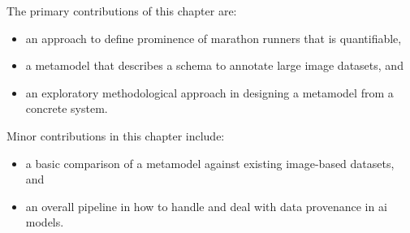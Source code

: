 \bigskip

\noindent
The primary contributions of this chapter are:

\begin{itemize}
  \item an approach to define prominence of marathon runners that is quantifiable,
  \item a metamodel that describes a schema to annotate large image datasets, and
  \item an exploratory methodological approach in designing a metamodel from a concrete system.
\end{itemize}

\noindent
Minor contributions in this chapter include:

\begin{itemize}
  \item a basic comparison of a metamodel against existing image-based datasets, and
  \item an overall pipeline in how to handle and deal with data provenance in \gls{ai} models.
\end{itemize}



